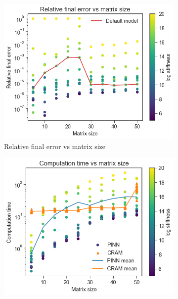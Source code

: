 \documentclass[10pt]{article}
\begin{document}
\begin{figure}
\begin{subfigure}[b]{0.48\textwidth}
         \label{fig:time_vs_stiffness}
     \end{subfigure}
     \\
     \begin{subfigure}[b]{0.48\textwidth}
         \centering
         \includegraphics[width=\textwidth]{error_vs_size_multi.png}
         \caption{Relative final error vs matrix size}
         \label{fig:error_vs_size}
     \end{subfigure}
     \hfill
     \begin{subfigure}[b]{0.48\textwidth}
         \centering
         \includegraphics[width=\textwidth]{time_vs_size_multi.png}

\end{subfigure}
\end{figure}
\end{document}
